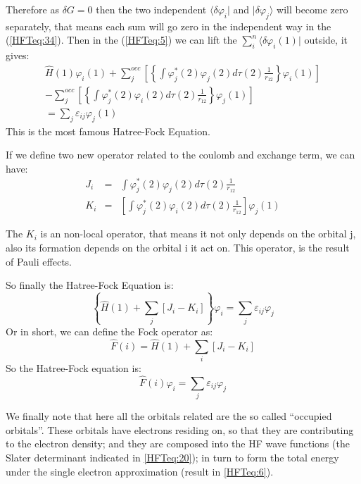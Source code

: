 Therefore as $\delta G = 0$ then the two independent
$\langle\delta\varphi_{i}|$ and $|\delta\varphi_{j}\rangle$ will
become zero separately, that means each sum will go zero in the
independent way in the (\ref{HFTeq:34}). Then in the (\ref{HFTeq:5})
we can lift the $\sum_{i}^{n}\langle\delta\varphi_{i}(1)|$ outside,
it gives:
\begin{multline}\label{HFTeq:9}
\hat{H}(1)\varphi_{i}(1) + \sum_{j}^{occ}\left[
\left\{\int\varphi^{*}_{j}(2)\varphi_{j}(2)d\tau(2)\frac{1}{r_{12}}\right\}\varphi_{i}(1)
\right] \\
 -
\sum_{j}^{occ}\left[
\left\{\int\varphi^{*}_{j}(2)\varphi_{i}(2)d\tau(2)\frac{1}{r_{12}}\right\}\varphi_{j}(1)
\right] \\
 = \sum_{j} \varepsilon_{ij}\varphi_{j}(1)
\end{multline}
This is the most famous Hatree-Fock Equation.

If we define two new operator related to the coulomb and exchange
term, we can have:
\begin{eqnarray}\label{HFTeq:31}
  J_{i} &=& \int\varphi^{*}_{j}(2)\varphi_{j}(2)d\tau(2)\frac{1}{r_{12}} \nonumber \\
  K_{i} &=& \left[\int\varphi^{*}_{j}(2)\varphi_{i}(2)d\tau(2)\frac{1}{r_{12}}\right]\varphi_{j}(1)
\end{eqnarray}

The $K_{i}$ is an non-local operator, that means it not only depends
on the orbital j, also its formation depends on the orbital i it act
on. This operator, is the result of Pauli effects.

So finally the Hatree-Fock Equation is:
\begin{equation}\label{HFTeq:10}
\left\{\hat{H}(1)+ \sum_{j}[J_{i} - K_{i}] \right\}\varphi_{i} =
\sum_{j} \varepsilon_{ij}\varphi_{j}
\end{equation}
Or in short, we can define the Fock operator as:
\begin{equation}\label{}
\hat{F}(i) =\hat{H}(1)+ \sum_{i}[J_{i} - K_{i}]
\end{equation}
So the Hatree-Fock equation is:
\begin{equation}\label{}
\hat{F}(i)\varphi_{i} = \sum_{j} \varepsilon_{ij}\varphi_{j}
\end{equation}

We finally note that here all the orbitals related are the so called ``occupied
orbitals''. These orbitals have electrons residing on, so that they are
contributing to the electron density; and they are composed into the HF wave
functions (the Slater determinant indicated in \ref{HFTeq:20}); in turn to
form the total energy under the single electron approximation (result in
\ref{HFTeq:6}).

